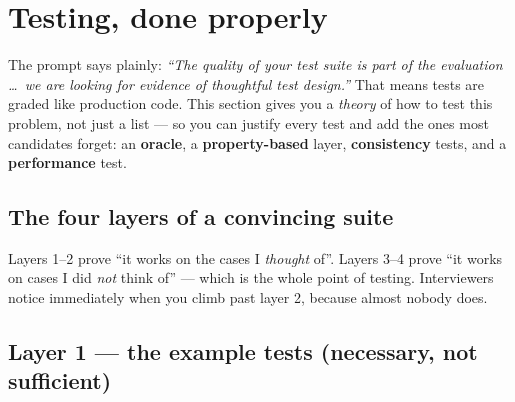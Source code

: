 \section{Testing, done properly}

The prompt says plainly: \emph{``The quality of your test suite is part of the
evaluation \dots\ we are looking for evidence of thoughtful test design.''} That
means tests are graded like production code. This section gives you a
\emph{theory} of how to test this problem, not just a list --- so you can justify
every test and add the ones most candidates forget: an \textbf{oracle}, a
\textbf{property-based} layer, \textbf{consistency} tests, and a
\textbf{performance} test.

\subsection{The four layers of a convincing suite}

\begin{center}
\end{center}

\begin{intu}
Layers 1--2 prove ``it works on the cases I \emph{thought} of''. Layers 3--4 prove
``it works on cases I did \emph{not} think of'' --- which is the whole point of
testing. Interviewers notice immediately when you climb past layer 2, because
almost nobody does.
\end{intu}

\subsection{Layer 1 --- the example tests (necessary, not sufficient)}

